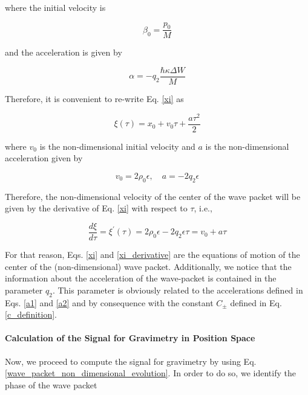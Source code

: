 \documentclass{article}
\begin{document}
where the initial velocity is

\begin{equation}
\beta_{0} = \frac{p_{0}}{M}
\end{equation}

and the acceleration is given by

\begin{equation}\label{q2_a}
\alpha = -q_{2} \frac{ \hbar \kappa \Delta W}{M}
\end{equation}

Therefore, it is convenient to re-write Eq. \ref{xi} as

\begin{equation}\label{xi_eq_motion}
\xi(\tau) = x_{0} + v_{0} \tau + \frac{a \tau^{2}}{2}
\end{equation}

where $v_{0}$ is the non-dimensional initial velocity and $a$ is the non-dimensional acceleration given by

\begin{equation}\label{xi_defs_eq_motion}
v_{0} = 2\rho_{0} \epsilon \mathrm{,}\quad a = -2 q_{2} \epsilon
\end{equation}

Therefore, the non-dimensional velocity of the center of the wave packet will be given by the derivative of Eq. \ref{xi} with respect to $\tau$, i.e.,

\begin{equation}\label{xi_derivative}
\frac{d\xi}{d\tau} = \xi^{\prime}(\tau) =  2 \rho_{0} \epsilon - 2 q_{2}\epsilon \tau = v_{0} + a \tau
\end{equation}

For that reason, Eqs. \ref{xi} and \ref{xi_derivative} are the equations of motion of the center of the (non-dimensional) wave packet. Additionally, we notice that the information about the acceleration of the wave-packet is contained in the parameter $q_{2}$. This parameter is obviously related to the accelerations defined in Eqs. \ref{a1} and \ref{a2} and by consequence with the constant $C_{\pm}$ defined in Eq. \ref{c_definition}.

\paragraph{Calculation of the Signal for Gravimetry in Position Space}

Now, we proceed to compute the signal for gravimetry by using Eq. \ref{wave_packet_non_dimensional_evolution}. In order to do so, we identify the phase of the wave packet
\end{document}
